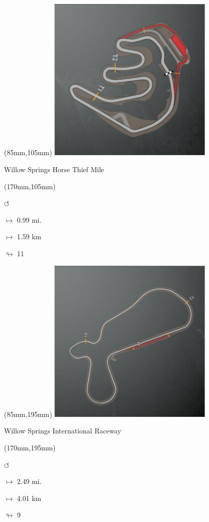 \begin{textblock*}{80mm}(85mm,105mm)%
\includegraphics[width=80mm]{TR/2015-05-20_00069.png}
\centerline{Willow Springs Horse Thief Mile}
\end{textblock*}
\begin{textblock*}{30mm}(170mm,105mm)%
\par \Huge$\circlearrowleft$
\Large
\par$\mapsto$ 0.99 mi.
\par$\mapsto$ 1.59 km
\par$\looparrowright$ 11
\end{textblock*}
\begin{textblock*}{80mm}(85mm,195mm)%
\includegraphics[width=80mm]{TR/2015-05-20_00068.png}
\centerline{Willow Springs International Raceway}
\end{textblock*}
\begin{textblock*}{30mm}(170mm,195mm)%
\par \Huge$\circlearrowleft$
\Large
\par$\mapsto$ 2.49 mi.
\par$\mapsto$ 4.01 km
\par$\looparrowright$ 9
\end{textblock*}
\null\newpage

